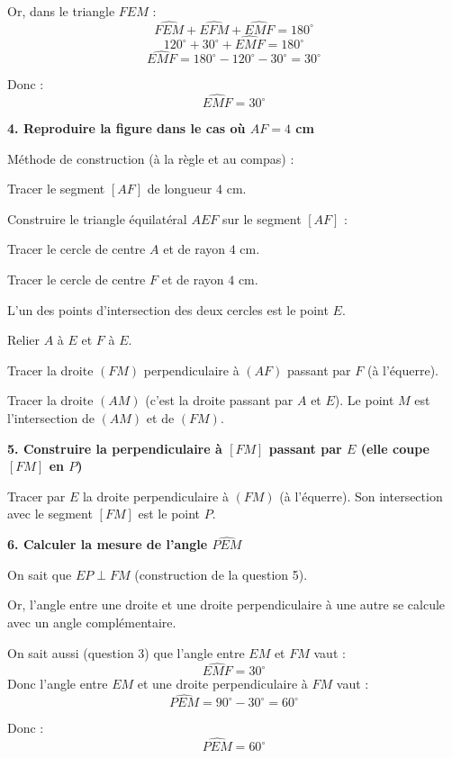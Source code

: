 \documentclass[answers]{exam}
\begin{document}
\begin{solution}
Or, dans le triangle $FEM$ :
\[
\widehat{FEM} + \widehat{EFM} + \widehat{EMF} = 180^\circ
\]
\[
120^\circ + 30^\circ + \widehat{EMF} = 180^\circ
\]
\[
\widehat{EMF} = 180^\circ - 120^\circ - 30^\circ = 30^\circ
\]

Donc :
\[
\boxed{\widehat{EMF}=30^\circ}
\]

\medskip

\textbf{4. Reproduire la figure dans le cas où $AF=4$ cm}

\begin{Indication}
Méthode de construction (à la règle et au compas) :
\begin{compactitem}
\item Tracer le segment $[AF]$ de longueur $4$ cm.
\item Construire le triangle équilatéral $AEF$ sur le segment $[AF]$ :
  \begin{compactitem}
  \item Tracer le cercle de centre $A$ et de rayon $4$ cm.
  \item Tracer le cercle de centre $F$ et de rayon $4$ cm.
  \item L'un des points d'intersection des deux cercles est le point $E$.
  \item Relier $A$ à $E$ et $F$ à $E$.
  \end{compactitem}
\item Tracer la droite $(FM)$ perpendiculaire à $(AF)$ passant par $F$ (à l'équerre).
\item Tracer la droite $(AM)$ (c'est la droite passant par $A$ et $E$). Le point $M$ est l'intersection de $(AM)$ et de $(FM)$.
\end{compactitem}
\end{Indication}

\medskip

\textbf{5. Construire la perpendiculaire à $[FM]$ passant par $E$ (elle coupe $[FM]$ en $P$)}

\begin{Indication}
Tracer par $E$ la droite perpendiculaire à $(FM)$ (à l'équerre). Son intersection avec le segment $[FM]$ est le point $P$.
\end{Indication}

\medskip

\textbf{6. Calculer la mesure de l'angle $\widehat{PEM}$}

On sait que $EP \perp FM$ (construction de la question 5).

Or, l'angle entre une droite et une droite perpendiculaire à une autre se calcule avec un angle complémentaire.

On sait aussi (question 3) que l'angle entre $EM$ et $FM$ vaut :
\[
\widehat{EMF}=30^\circ
\]
Donc l'angle entre $EM$ et une droite perpendiculaire à $FM$ vaut :
\[
\widehat{PEM} = 90^\circ - 30^\circ = 60^\circ
\]

Donc :
\[
\boxed{\widehat{PEM}=60^\circ}
\]

\end{solution}
\end{document}
